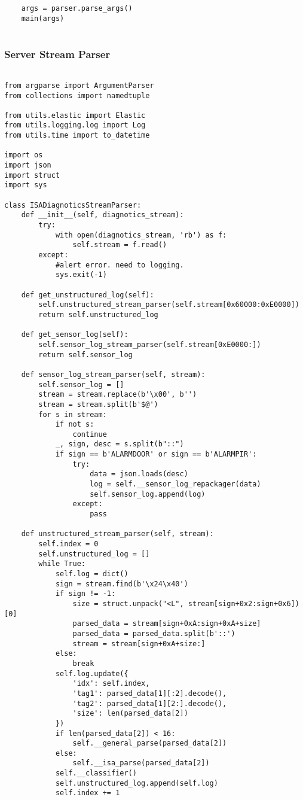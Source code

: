 \documentclass{easychair}
\begin{document}
\begin{enumerate}
\begin{lstlisting}
    args = parser.parse_args()
    main(args)


\end{lstlisting}

\subsubsection{Server Stream Parser}

\lstset{language=Python}
\lstset{frame=lines}
\lstset{basicstyle=\footnotesize}
\begin{lstlisting}

from argparse import ArgumentParser
from collections import namedtuple

from utils.elastic import Elastic
from utils.logging.log import Log
from utils.time import to_datetime

import os
import json
import struct
import sys

class ISADiagnoticsStreamParser:
    def __init__(self, diagnotics_stream):
        try:
            with open(diagnotics_stream, 'rb') as f:
                self.stream = f.read()
        except:
            #alert error. need to logging.
            sys.exit(-1)

    def get_unstructured_log(self):
        self.unstructured_stream_parser(self.stream[0x60000:0xE0000])
        return self.unstructured_log

    def get_sensor_log(self):
        self.sensor_log_stream_parser(self.stream[0xE0000:])
        return self.sensor_log

    def sensor_log_stream_parser(self, stream):
        self.sensor_log = []
        stream = stream.replace(b'\x00', b'')
        stream = stream.split(b'$@')
        for s in stream:
            if not s:
                continue
            _, sign, desc = s.split(b"::")
            if sign == b'ALARMDOOR' or sign == b'ALARMPIR':
                try:
                    data = json.loads(desc)
                    log = self.__sensor_log_repackager(data)
                    self.sensor_log.append(log)
                except:
                    pass

    def unstructured_stream_parser(self, stream):
        self.index = 0
        self.unstructured_log = []
        while True:
            self.log = dict()
            sign = stream.find(b'\x24\x40')
            if sign != -1:
                size = struct.unpack("<L", stream[sign+0x2:sign+0x6])[0]
                parsed_data = stream[sign+0xA:sign+0xA+size]
                parsed_data = parsed_data.split(b'::')
                stream = stream[sign+0xA+size:]
            else:
                break
            self.log.update({
                'idx': self.index,
                'tag1': parsed_data[1][:2].decode(),
                'tag2': parsed_data[1][2:].decode(),
                'size': len(parsed_data[2])
            })
            if len(parsed_data[2]) < 16:
                self.__general_parse(parsed_data[2])
            else:
                self.__isa_parse(parsed_data[2])
            self.__classifier()
            self.unstructured_log.append(self.log)
            self.index += 1


\end{lstlisting}
\end{enumerate}
\end{document}
